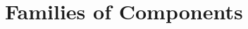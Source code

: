 \documentclass[12pt ]{article}
\begin{document}





\section{Families of Components}\label{components}
\end{document}
